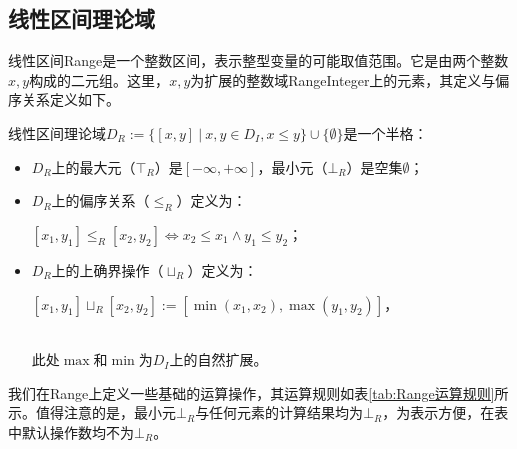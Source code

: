 \subsection{线性区间理论域}
\label{sec:Range}

线性区间Range是一个整数区间，表示整型变量的可能取值范围。它是由两个整数$ x, y $构成的二元组。这里，$ x, y $为扩展的整数域RangeInteger上的元素，其定义与偏序关系定义如下。

\begin{definition}
	线性区间理论域$ D_R :=  \{ [x, y]~ |~ x , y \in D_I, x \le y \} \cup \{ \emptyset \}$是一个半格：	
	\begin{itemize}
		\item $ D_R $上的最大元（$ \top_R $）是$ [-\infty, +\infty] $，最小元（$ \bot_R $）是空集$ \emptyset $；
		\item $ D_R $上的偏序关系（$ \le_R $）定义为：\\	
		\centerline{$ [x_1, y_1] \le_R [x_2, y_2] \iff x_2 \le x_1 \land y_1 \le y_2 $；}
		\item $ D_R $上的上确界操作（$ \sqcup_R $）定义为：\\	
		\centerline{$ [x_1, y_1] \sqcup_R [x_2, y_2] := [\min(x_1, x_2), \max(y_1, y_2)] $，}  \\
		此处$ \max $和$ \min $为$ D_I $上的自然扩展。
	\end{itemize}
\end{definition}

我们在Range上定义一些基础的运算操作，其运算规则如表\ref{tab:Range运算规则}所示。值得注意的是，最小元$ \bot_R $与任何元素的计算结果均为$ \bot_R $，为表示方便，在表中默认操作数均不为$ \bot_R $。

